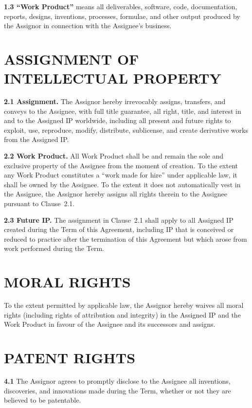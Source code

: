 \documentclass[10pt]{article}
\begin{document}
\textbf{1.3 ``Work Product''} means all deliverables, software, code, documentation, reports, designs, inventions, processes, formulae, and other output produced by the Assignor in connection with the Assignee's business.

\section{ASSIGNMENT OF INTELLECTUAL PROPERTY}

\textbf{2.1 Assignment.} The Assignor hereby irrevocably assigns, transfers, and conveys to the Assignee, with full title guarantee, all right, title, and interest in and to the Assigned IP worldwide, including all present and future rights to exploit, use, reproduce, modify, distribute, sublicense, and create derivative works from the Assigned IP.

\textbf{2.2 Work Product.} All Work Product shall be and remain the sole and exclusive property of the Assignee from the moment of creation. To the extent any Work Product constitutes a ``work made for hire'' under applicable law, it shall be owned by the Assignee. To the extent it does not automatically vest in the Assignee, the Assignor hereby assigns all rights therein to the Assignee pursuant to Clause~2.1.

\textbf{2.3 Future IP.} The assignment in Clause~2.1 shall apply to all Assigned IP created during the Term of this Agreement, including IP that is conceived or reduced to practice after the termination of this Agreement but which arose from work performed during the Term.

\section{MORAL RIGHTS}

To the extent permitted by applicable law, the Assignor hereby waives all moral rights (including rights of attribution and integrity) in the Assigned IP and the Work Product in favour of the Assignee and its successors and assigns.

\section{PATENT RIGHTS}

\textbf{4.1} The Assignor agrees to promptly disclose to the Assignee all inventions, discoveries, and innovations made during the Term, whether or not they are believed to be patentable.
\end{document}
